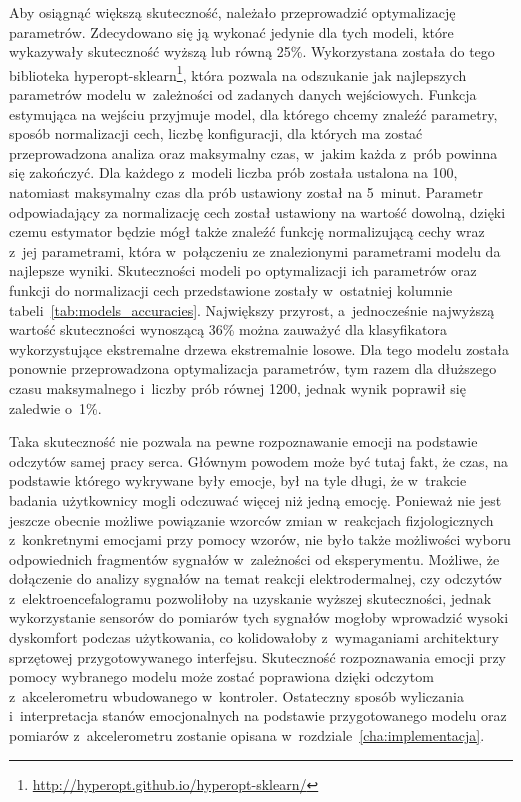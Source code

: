 Aby osiągnąć większą skuteczność, należało przeprowadzić optymalizację parametrów. Zdecydowano się ją wykonać jedynie dla tych modeli, które wykazywały skuteczność wyższą lub równą 25\%. Wykorzystana została do tego biblioteka hyperopt-sklearn\footnote{\url{http://hyperopt.github.io/hyperopt-sklearn/}}, która pozwala na odszukanie jak najlepszych parametrów modelu w~zależności od zadanych danych wejściowych. Funkcja estymująca na wejściu przyjmuje model, dla którego chcemy znaleźć parametry, sposób normalizacji cech, liczbę konfiguracji, dla których ma zostać przeprowadzona analiza oraz maksymalny czas, w~jakim każda z~prób powinna się zakończyć. Dla każdego z~modeli liczba prób została ustalona na 100, natomiast maksymalny czas dla prób ustawiony został na 5~minut. Parametr odpowiadający za normalizację cech został ustawiony na wartość dowolną, dzięki czemu estymator będzie mógł także znaleźć funkcję normalizującą cechy wraz z~jej parametrami, która w~połączeniu ze znalezionymi parametrami modelu da najlepsze wyniki. Skuteczności modeli po optymalizacji ich parametrów oraz funkcji do normalizacji cech przedstawione zostały w~ostatniej kolumnie tabeli~\ref{tab:models_accuracies}. Największy przyrost, a~jednocześnie najwyższą wartość skuteczności wynoszącą 36\% można zauważyć dla klasyfikatora wykorzystujące ekstremalne drzewa ekstremalnie losowe. Dla tego modelu została ponownie przeprowadzona optymalizacja parametrów, tym razem dla dłuższego czasu maksymalnego i~liczby prób równej 1200, jednak wynik poprawił się zaledwie o~1\%. 

Taka skuteczność nie pozwala na pewne rozpoznawanie emocji na podstawie odczytów samej pracy serca. Głównym powodem może być tutaj fakt, że czas, na podstawie którego wykrywane były emocje, był na tyle długi, że w~trakcie badania użytkownicy mogli odczuwać więcej niż jedną emocję. Ponieważ nie jest jeszcze obecnie możliwe powiązanie wzorców zmian w~reakcjach fizjologicznych z~konkretnymi emocjami przy pomocy wzorów, nie było także możliwości wyboru odpowiednich fragmentów sygnałów w~zależności od eksperymentu. Możliwe, że dołączenie do analizy sygnałów na temat reakcji elektrodermalnej, czy odczytów z~elektroencefalogramu pozwoliłoby na uzyskanie wyższej skuteczności, jednak wykorzystanie sensorów do pomiarów tych sygnałów mogłoby wprowadzić wysoki dyskomfort podczas użytkowania, co kolidowałoby z~wymaganiami architektury sprzętowej przygotowywanego interfejsu. Skuteczność rozpoznawania emocji przy pomocy wybranego modelu może zostać poprawiona dzięki odczytom z~akcelerometru wbudowanego w~kontroler. Ostateczny sposób wyliczania i~interpretacja stanów emocjonalnych na podstawie przygotowanego modelu oraz pomiarów z~akcelerometru zostanie opisana w~rozdziale~\ref{cha:implementacja}.